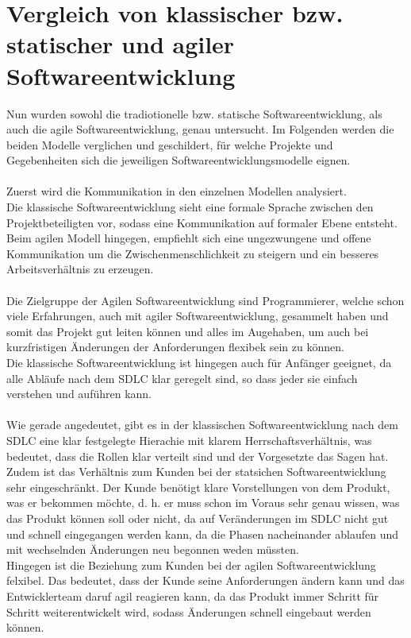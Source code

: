\documentclass[a4paper, 10pt]{scrartcl}
\begin{document}
\section{Vergleich von klassischer bzw. statischer und agiler Softwareentwicklung}
Nun wurden sowohl die tradiotionelle bzw. statische Softwareentwicklung, als auch die agile Softwareentwicklung, genau untersucht. Im Folgenden werden die beiden Modelle verglichen und geschildert, für welche Projekte und Gegebenheiten sich die jeweiligen Softwareentwicklungsmodelle eignen.\\\\
Zuerst wird die Kommunikation in den einzelnen Modellen analysiert.\\
Die klassische Softwareentwicklung sieht eine formale Sprache zwischen den Projektbeteiligten vor, sodass eine Kommunikation auf formaler Ebene entsteht.\\
Beim agilen Modell hingegen, empfiehlt sich eine ungezwungene und offene Kommunikation um die Zwischenmenschlichkeit zu steigern und ein besseres Arbeitsverhältnis zu erzeugen.\\\\
Die Zielgruppe der Agilen Softwareentwicklung sind Programmierer, welche schon viele Erfahrungen, auch mit agiler Softwareentwicklung, gesammelt haben und somit das Projekt gut leiten können und alles \glqq im Auge\grqq haben, um auch bei kurzfristigen Änderungen der Anforderungen flexibek sein zu können.\\
Die klassische Softwareentwicklung ist hingegen auch für Anfänger geeignet, da alle Abläufe nach dem SDLC klar geregelt sind, so dass jeder sie einfach verstehen und auführen kann.\\\\
Wie gerade angedeutet, gibt es in der klassischen Softwareentwicklung nach dem SDLC eine klar festgelegte Hierachie mit klarem \glqq Herrschaftsverhältnis\grqq{}, was bedeutet, dass die Rollen klar verteilt sind und der Vorgesetzte \glqq das Sagen\grqq{} hat.\\
Zudem ist das Verhältnis zum Kunden bei der statsichen Softwareentwicklung sehr eingeschränkt. Der Kunde benötigt klare Vorstellungen von dem Produkt, was er bekommen möchte, d. h. er muss schon im Voraus sehr genau wissen, was das Produkt können soll oder nicht, da auf Veränderungen im SDLC nicht gut und schnell eingegangen werden kann, da die Phasen nacheinander ablaufen und mit wechselnden Änderungen neu begonnen weden müssten.\\
Hingegen ist die Beziehung zum Kunden bei der agilen Softwareentwicklung felxibel. Das bedeutet, dass der Kunde seine Anforderungen ändern kann und das Entwicklerteam daruf agil reagieren kann, da das Produkt immer Schritt für Schritt weiterentwickelt wird, sodass Änderungen schnell eingebaut werden können.\\\\
\end{document}
